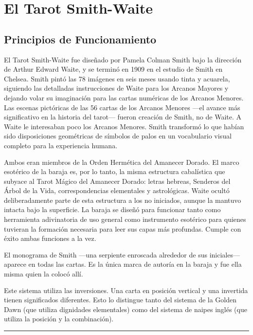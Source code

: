 \chapter{El Tarot Smith-Waite}\label{the-smith-waite-tarot}

\section{Principios de Funcionamiento}\label{operating-principles}

El Tarot Smith-Waite fue diseñado por Pamela Colman Smith bajo la dirección de Arthur Edward Waite, y se terminó en 1909 en el estudio de Smith en Chelsea. Smith pintó las 78 imágenes en seis meses usando tinta y acuarela, siguiendo las detalladas instrucciones de Waite para los Arcanos Mayores y dejando volar su imaginación para las cartas numéricas de los Arcanos Menores. Las escenas pictóricas de las 56 cartas de los Arcanos Menores ---el avance más significativo en la historia del tarot--- fueron creación de Smith, no de Waite. A Waite le interesaban poco los Arcanos Menores. Smith transformó lo que habían sido disposiciones geométricas de símbolos de palos en un vocabulario visual completo para la experiencia humana.

Ambos eran miembros de la Orden Hermética del Amanecer Dorado. El marco esotérico de la baraja es, por lo tanto, la misma estructura cabalística que subyace al Tarot Mágico del Amanecer Dorado: letras hebreas, Senderos del Árbol de la Vida, correspondencias elementales y astrológicas. Waite ocultó deliberadamente parte de esta estructura a los no iniciados, aunque la mantuvo intacta bajo la superficie. La baraja se diseñó para funcionar tanto como herramienta adivinatoria de uso general como instrumento esotérico para quienes tuvieran la formación necesaria para leer sus capas más profundas. Cumple con éxito ambas funciones a la vez.

El monograma de Smith ---una serpiente enroscada alrededor de sus iniciales--- aparece en todas las cartas. Es la única marca de autoría en la baraja y fue ella misma quien la colocó allí.

Este sistema utiliza las inversiones. Una carta en posición vertical y una invertida tienen significados diferentes. Esto lo distingue tanto del sistema de la Golden Dawn (que utiliza dignidades elementales) como del sistema de naipes inglés (que utiliza la posición y la combinación).

\begin{center}\rule{0.5\linewidth}{0.5pt}\end{center}

